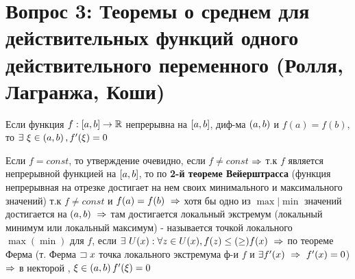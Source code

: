 \section{Вопрос 3: Теоремы о среднем для действительных функций одного действительного переменного (Ролля, Лагранжа, Коши)}

\begin{proofs}
	Если функция $f: \left[ a,b\right] \to \mathbb{R}$ непрерывна на $\left[ a,b\right]$, диф-ма $\left( a,b\right)$ и $f(a) = f(b)$, то $\exists \ \xi \in \left( a,b\right), f^{\prime}(\xi) = 0$

	\begin{dokvo}
		Если $f= const$, то утверждение очевидно, если $f \neq const$ $\Rightarrow$ т.к $f$ является непрерывной функцией на $\left[ a,b\right]$, то по \textbf{2-й теореме Вейерштрасса} (функция непрерывная на отрезке достигает на нем своих минимального и максимального значений) т.к $f \neq const$ и $f(a) = f(b) \ \Rightarrow$ хотя бы одно из $\max|\min$ значений достигается на $\skobk{a,b} \ \sledue$ там достигается локальный экстремум (локальный минимум или локальный максимум) -  называется точкой локального $\max(\min)$ для $f$, если $\exists \ U(x): \forall z \in U(x), f(z) \leq (\geq) f(x) \ \Rightarrow$ по теореме Ферма (т. Ферма $\sqsupset x$ точка локального экстремума ф-и $f$ и $\exists f^{\shtrih}(x)\ \sledue \ f^{\shtrih}(x)=0$) $\Rightarrow$ в некторой \vtochke{\xi}, $\xi \in \left( a,b\right) f^{\prime}(\xi) = 0$
	\end{dokvo}
\end{proofs}

